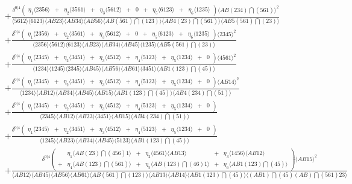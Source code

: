 \documentclass[11pt, reqno]{article}
\newcommand{\ab}[1]{\langle #1\rangle}
\begin{document}
\begin{minipage}[h!]{4cm}
\begin{align*}
&+\frac{\delta^{0|4}
\left(\begin{array}{lclclclclcl} \eta_{1}\ab{2356}&+&\eta_{2}\ab{3561}&+&\eta_{3}\ab{5612}&+&0&+&\eta_{5}\ab{6123}&+&\eta_{6}\ab{1235}\end{array}\right)\ab{AB(234)\bigcap(561)}^2}{\ab{5612} \ab{6123} \ab{AB23} \ab{AB34} \ab{AB56} \ab{AB(561)\bigcap(123)} \ab{AB4(23)\bigcap(561)} \ab{AB5(561)\bigcap(23)}}\\
&+\frac{\delta^{0|4}
\left(\begin{array}{lclclclclcl} \eta_{1}\ab{2356}&+&\eta_{2}\ab{3561}&+&\eta_{3}\ab{5612}&+&0&+&\eta_{5}\ab{6123}&+&\eta_{6}\ab{1235}\end{array}\right)\ab{2345}^2}{\ab{2356} \ab{5612} \ab{6123} \ab{AB23} \ab{AB34} \ab{AB45} \ab{1235} \ab{AB5(561)\bigcap(23)}}\\
&+\frac{\delta^{0|4}
\left(\begin{array}{lclclclclcl} \eta_{1}\ab{2345}&+&\eta_{2}\ab{3451}&+&\eta_{3}\ab{4512}&+&\eta_{4}\ab{5123}&+&\eta_{5}\ab{1234}&+&0\end{array}\right)\ab{4561}^2}{\ab{1234} \ab{1245} \ab{2345} \ab{AB45} \ab{AB56} \ab{AB61} \ab{3451} \ab{AB1(123)\bigcap(45)}}\\
&+\frac{\delta^{0|4}
\left(\begin{array}{lclclclclcl} \eta_{1}\ab{2345}&+&\eta_{2}\ab{3451}&+&\eta_{3}\ab{4512}&+&\eta_{4}\ab{5123}&+&\eta_{5}\ab{1234}&+&0\end{array}\right)\ab{AB14}^2}{\ab{1234} \ab{AB12} \ab{AB34} \ab{AB45} \ab{AB15} \ab{AB1(123)\bigcap(45)} \ab{AB4(234)\bigcap(51)}}\\
&+\frac{\delta^{0|4}
\left(\begin{array}{lclclclclcl} \eta_{1}\ab{2345}&+&\eta_{2}\ab{3451}&+&\eta_{3}\ab{4512}&+&\eta_{4}\ab{5123}&+&\eta_{5}\ab{1234}&+&0\end{array}\right)}{\ab{2345} \ab{AB12} \ab{AB23} \ab{3451} \ab{AB15} \ab{AB4(234)\bigcap(51)}}\\
&+\frac{\delta^{0|4}
\left(\begin{array}{lclclclclcl} \eta_{1}\ab{2345}&+&\eta_{2}\ab{3451}&+&\eta_{3}\ab{4512}&+&\eta_{4}\ab{5123}&+&\eta_{5}\ab{1234}&+&0\end{array}\right)}{\ab{1245} \ab{AB23} \ab{AB34} \ab{AB45} \ab{5123} \ab{AB1(123)\bigcap(45)}}\\
&+\frac{\delta^{0|4}
\left(\begin{array}{clclcl}& \eta_{1}\ab{AB(23)\bigcap(456)1}&+&\eta_{2}\ab{4561} \ab{AB13}&+&\eta_{3}\ab{1456} \ab{AB12}\\+&\eta_{4}\ab{AB(123)\bigcap(561)}&+&\eta_{5}\ab{AB(123)\bigcap(46)1}&+&\eta_{6}\ab{AB1(123)\bigcap(45)}\end{array}\right)\ab{AB15}^2}{\ab{AB12} \ab{AB45} \ab{AB56} \ab{AB61} \ab{AB(561)\bigcap(123)} \ab{AB13} \ab{AB14} \ab{AB1(123)\bigcap(45)} \ab{(AB1)\bigcap(45)(AB)\bigcap(561)23}}\\

\end{align*}
\end{minipage}
\end{document}
